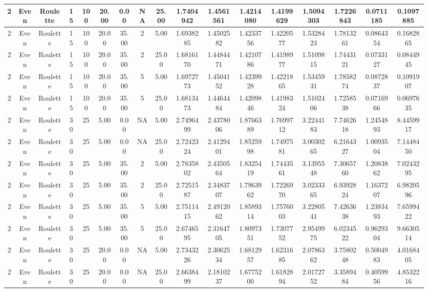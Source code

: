 \begin{longtable}{ | c | c | c | c | c | c | c | c | c | c | c | c | c | c | c | c | c | }
	\hline
	2	&	Even	&	Roulette	&	15	&	100	&	20.00	&	0.00	&	NA	&	25.00	&	1.7404942	&	1.4561561	&	1.4214080	&	1.4199629	&	1.5094303	&	1.7226843	&	0.0711185	&	0.1097885 \\
	\hline
	2	&	Even	&	Roulette	&	15	&	100	&	20.00	&	35.00	&	2	&	5.00	&	1.6938285	&	1.4502582	&	1.4233756	&	1.4220577	&	1.5328423	&	1.7813261	&	0.0864354	&	0.1682865 \\
	\hline
	2	&	Even	&	Roulette	&	15	&	100	&	20.00	&	35.00	&	2	&	25.00	&	1.6816170	&	1.4484471	&	1.4210786	&	1.4198977	&	1.5109815	&	1.7443121	&	0.0733127	&	0.0844945 \\
	\hline
	2	&	Even	&	Roulette	&	15	&	100	&	20.00	&	35.00	&	5	&	5.00	&	1.6972773	&	1.4504152	&	1.4239928	&	1.4221865	&	1.5345931	&	1.7858274	&	0.0872837	&	0.1091907 \\
	\hline
	2	&	Even	&	Roulette	&	15	&	100	&	20.00	&	35.00	&	5	&	25.00	&	1.6813473	&	1.4464484	&	1.4209846	&	1.4198324	&	1.5102406	&	1.7258538	&	0.0716966	&	0.0697635 \\
	\hline
	2	&	Even	&	Roulette	&	30	&	25	&	5.00	&	0.00	&	NA	&	5.00	&	2.7496499	&	2.4378006	&	1.8766389	&	1.7699712	&	3.2244183	&	7.7462618	&	1.2454893	&	8.4459917 \\
	\hline
	2	&	Even	&	Roulette	&	30	&	25	&	5.00	&	0.00	&	NA	&	25.00	&	2.7242324	&	2.4129401	&	1.8525998	&	1.7497581	&	3.0030265	&	6.2164327	&	1.0093504	&	7.1448450 \\
	\hline
	2	&	Even	&	Roulette	&	30	&	25	&	5.00	&	35.00	&	2	&	5.00	&	2.7835802	&	2.4350564	&	1.8325419	&	1.7443561	&	3.1395548	&	7.3065760	&	1.2083862	&	7.0243295 \\
	\hline
	2	&	Even	&	Roulette	&	30	&	25	&	5.00	&	35.00	&	2	&	25.00	&	2.7251587	&	2.3483707	&	1.7963962	&	1.7226970	&	3.0233365	&	6.9392824	&	1.1637207	&	6.9820596 \\
	\hline
	2	&	Even	&	Roulette	&	30	&	25	&	5.00	&	35.00	&	5	&	5.00	&	2.7511415	&	2.4912062	&	1.8589314	&	1.7576003	&	3.2280541	&	7.4263638	&	1.2383493	&	7.6599422 \\
	\hline
	2	&	Even	&	Roulette	&	30	&	25	&	5.00	&	35.00	&	5	&	25.00	&	2.6746595	&	2.3164705	&	1.8097351	&	1.7307752	&	2.9549975	&	6.0234522	&	0.9629304	&	9.6630514 \\
	\hline
	2	&	Even	&	Roulette	&	30	&	25	&	20.00	&	0.00	&	NA	&	5.00	&	2.7343226	&	2.3062534	&	1.6812957	&	1.6231685	&	2.0786362	&	3.7580248	&	0.5004983	&	4.0168405 \\
	\hline
	2	&	Even	&	Roulette	&	30	&	25	&	20.00	&	0.00	&	NA	&	25.00	&	2.6638499	&	2.1810237	&	1.6775200	&	1.6182894	&	2.0172752	&	3.3589484	&	0.4059956	&	4.8532216 \\

\end{longtable}
